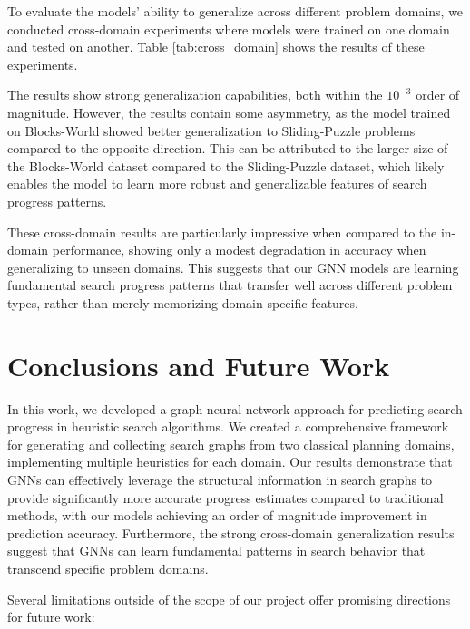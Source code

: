 \documentclass[letterpaper]{article}
\begin{document}
To evaluate the models' ability to generalize across different problem domains, we conducted cross-domain experiments where models were trained on one domain and tested on another. Table \ref{tab:cross_domain} shows the results of these experiments.

The results show strong generalization capabilities, both within the $10^{-3}$ order of magnitude.
However, the results contain some asymmetry, as the model trained on Blocks-World showed better generalization to Sliding-Puzzle problems compared to the opposite direction. This can be attributed to the larger size of the Blocks-World dataset compared to the Sliding-Puzzle dataset, which likely enables the model to learn more robust and generalizable features of search progress patterns.

These cross-domain results are particularly impressive when compared to the in-domain performance, showing only a modest degradation in accuracy when generalizing to unseen domains. This suggests that our GNN models are learning fundamental search progress patterns that transfer well across different problem types, rather than merely memorizing domain-specific features.

\section{Conclusions and Future Work}

In this work, we developed a graph neural network approach for predicting search progress in heuristic search algorithms. We created a comprehensive framework for generating and collecting search graphs from two classical planning domains, implementing multiple heuristics for each domain. Our results demonstrate that GNNs can effectively leverage the structural information in search graphs to provide significantly more accurate progress estimates compared to traditional methods, with our models achieving an order of magnitude improvement in prediction accuracy. Furthermore, the strong cross-domain generalization results suggest that GNNs can learn fundamental patterns in search behavior that transcend specific problem domains.

Several limitations outside of the scope of our project offer promising directions for future work:
\end{document}
